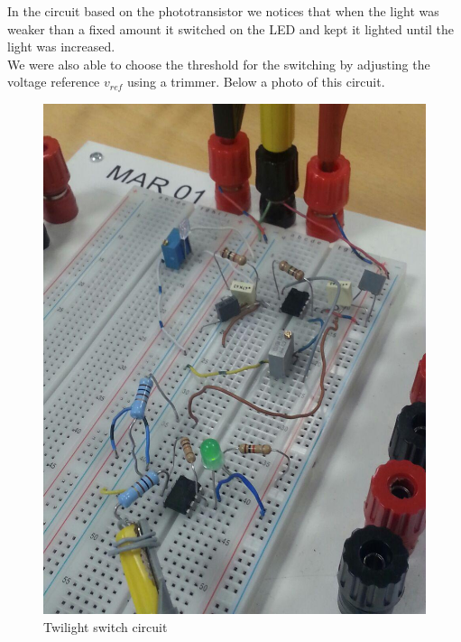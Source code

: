 In the circuit based on the phototransistor we notices that when the light was weaker than a fixed amount it switched on the LED and kept it lighted until the light was increased.\\
We were also able to choose the threshold for the switching by adjusting the voltage reference $v_{ref}$ using a trimmer. Below a photo of this circuit. 
\begin{figure}[H]
\centering
\includegraphics[width=.4\textwidth]{5/sw.jpg}
\caption{Twilight switch circuit}
\end{figure}
